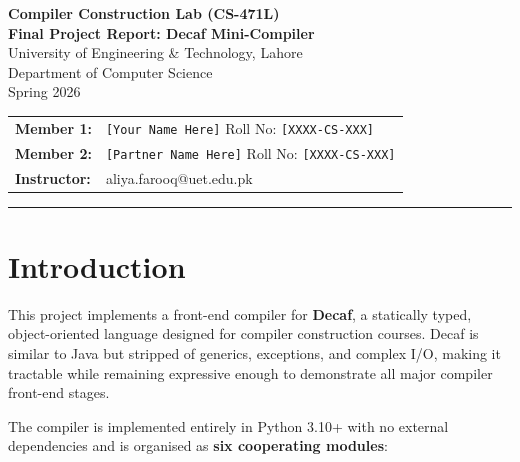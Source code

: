\documentclass[12pt,a4paper]{article}
\begin{document}
\begin{center}
  {\LARGE\bfseries Compiler Construction Lab (CS-471L)}\\[6pt]
  {\large\bfseries Final Project Report: Decaf Mini-Compiler}\\[10pt]
  University of Engineering \& Technology, Lahore\\
  Department of Computer Science\\
  Spring 2026\\[14pt]

  \begin{tabular}{ll}
    \textbf{Member 1:} & \texttt{[Your Name Here]} \quad Roll No: \texttt{[XXXX-CS-XXX]} \\[4pt]
    \textbf{Member 2:} & \texttt{[Partner Name Here]} \quad Roll No: \texttt{[XXXX-CS-XXX]} \\[4pt]
    \textbf{Instructor:} & aliya.farooq@uet.edu.pk \\
  \end{tabular}
\end{center}

\vspace{4pt}
\hrule
\vspace{12pt}

\section{Introduction}

This project implements a front-end compiler for \textbf{Decaf}, a statically typed,
object-oriented language designed for compiler construction courses. Decaf is similar
to Java but stripped of generics, exceptions, and complex I/O, making it tractable
while remaining expressive enough to demonstrate all major compiler front-end stages.

The compiler is implemented entirely in Python 3.10+ with no external dependencies
and is organised as \textbf{six cooperating modules}:
\end{document}
